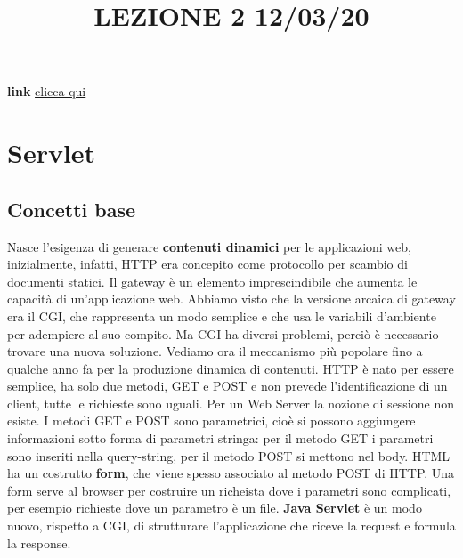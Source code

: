 \title{LEZIONE 2 12/03/20}\newline
\textbf{link} \href{https://web.microsoftstream.com/video/58568b1d-5fc5-41c0-88f6-608e4b8f9f7a}{clicca qui}
\section{Servlet}
\subsection{Concetti base}
Nasce l'esigenza di generare \textbf{contenuti dinamici} per le applicazioni web, inizialmente, infatti, HTTP era concepito come protocollo per scambio di documenti statici.\newline
\newline
Il gateway è un elemento imprescindibile che aumenta le capacità di un'applicazione web. Abbiamo visto che la versione arcaica di gateway era il CGI, che rappresenta un modo semplice e che usa le variabili d'ambiente per adempiere al suo compito. Ma CGI ha diversi problemi, perciò è necessario trovare una nuova soluzione.\newline
\newline
Vediamo ora il meccanismo più popolare fino a qualche anno fa per la produzione dinamica di contenuti.\newline
\newline
HTTP è nato per essere semplice, ha solo due metodi, GET e POST e non prevede l'identificazione di un client, tutte le richieste sono uguali.\newline
\newline
Per un Web Server la nozione di sessione non esiste.\newline
\newline
I metodi GET e POST sono parametrici, cioè si possono aggiungere informazioni sotto forma di parametri stringa: per il metodo GET i parametri sono inseriti nella query-string, per il metodo POST si mettono nel body.\newline
HTML ha un costrutto \textbf{form}, che viene spesso associato al metodo POST di HTTP. Una form serve al browser per costruire un richeista dove i parametri sono complicati, per esempio richieste dove un parametro è un file.\newline
\newline
\textbf{Java Servlet} è un modo nuovo, rispetto a CGI, di strutturare l'applicazione che riceve la request e formula la response.\newline
\newline
